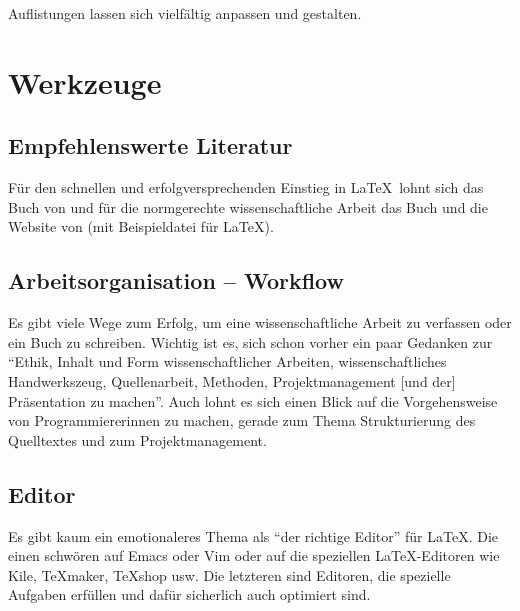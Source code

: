 \documentclass[12pt,	%
				headings=small,		%
				toc=bibliography,	%
			]	%
{scrreprt}		%
\begin{document}
			Auflistungen lassen sich vielfältig anpassen und gestalten.\autocite{schlosser}
	
	

\chapter{Werkzeuge}
\label{cha:werkzeuge}
\section{Empfehlenswerte Literatur}
	\label{sec:literaturempfehlung}
	Für den schnellen und erfolgversprechenden Einstieg in \LaTeX\ lohnt sich das Buch von \textcite{schlosser:einfuehrung} und für die normgerechte wissenschaftliche Arbeit das Buch und die Website von \textcite{scholz}(mit Beispieldatei für \LaTeX\autocite{scholz:latexvorlage}).

\section{Arbeitsorganisation -- Workflow}
\label{ref:ArbeitsorganisationWorkflow}
Es gibt viele Wege zum Erfolg, um eine wissenschaftliche Arbeit zu verfassen oder ein Buch zu schreiben.\autocite{rmf:workflow} Wichtig ist es, sich schon vorher ein paar Gedanken zur \enquote{Ethik, Inhalt und Form wissenschaftlicher Arbeiten, wissenschaftliches Handwerkszeug, Quellenarbeit, Methoden, Projektmanagement [und der] Präsentation zu machen}.\autocite{w3l} Auch lohnt es sich einen Blick auf die Vorgehensweise von Programmierer\*innen zu machen, gerade zum Thema Strukturierung des Quelltextes und zum Projektmanagement.\autocite{passig}




\section{Editor}
\label{sec:editor}
	Es gibt kaum ein emotionaleres Thema als \enquote{der richtige Editor} für \LaTeX. Die einen schwören auf \textsf{Emacs} oder \textsf{Vim} oder auf die speziellen \LaTeX-Editoren wie \textsf{Kile}, \textsf{\TeX{}maker}, \textsf{\TeX{}shop} usw. 
	Die letzteren sind Editoren, die spezielle Aufgaben erfüllen und dafür sicherlich auch optimiert sind. 
	
\end{document}
